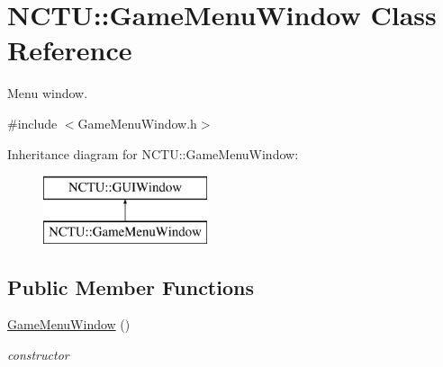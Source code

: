 \hypertarget{class_n_c_t_u_1_1_game_menu_window}{}\section{N\+C\+TU\+:\+:Game\+Menu\+Window Class Reference}
\label{class_n_c_t_u_1_1_game_menu_window}


Menu window.  




{\ttfamily \#include $<$Game\+Menu\+Window.\+h$>$}

Inheritance diagram for N\+C\+TU\+:\+:Game\+Menu\+Window\+:\begin{figure}[H]
\begin{center}
\leavevmode
\includegraphics[height=2.000000cm]{class_n_c_t_u_1_1_game_menu_window}
\end{center}
\end{figure}
\subsection*{Public Member Functions}
\begin{DoxyCompactItemize}
\item 
\hyperlink{class_n_c_t_u_1_1_game_menu_window_a5721659b034229cf3154122986bed825}{Game\+Menu\+Window} ()\hypertarget{class_n_c_t_u_1_1_game_menu_window_a5721659b034229cf3154122986bed825}{}\label{class_n_c_t_u_1_1_game_menu_window_a5721659b034229cf3154122986bed825}

\begin{DoxyCompactList}\small\item\em constructor \end{DoxyCompactList}\end{DoxyCompactItemize}
